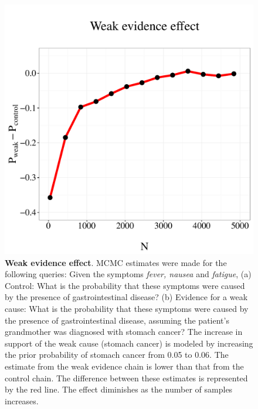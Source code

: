\begin{figure}
\centering
\includegraphics[scale = 0.5]{figures/weak.pdf}
 \caption{\textbf{Weak evidence effect}. MCMC estimates were made for the following queries: Given the symptoms \emph{fever, nausea}  and \emph{fatigue}, (a) Control: What is the probability that these symptoms were caused by the presence of gastrointestinal disease? (b) Evidence for a weak cause: What is the probability that these symptoms were caused by the presence of gastrointestinal disease, assuming the patient's grandmother was diagnosed with stomach cancer? The increase in support of the weak cause (stomach cancer) is modeled by increasing the prior probability of stomach cancer from 0.05 to 0.06. The estimate from the weak evidence chain is lower than that from the control chain. The difference between these estimates is represented by the red line. The effect diminishes as the number of samples increases.}
 \label{fig:weak}
\end{figure}


